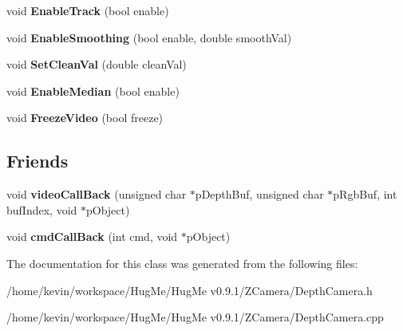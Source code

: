 \begin{DoxyCompactItemize}
\item 
\hypertarget{classCDepthCamera_ad0d6687953ff85c564a3c5dbc47611ca}{
void {\bfseries EnableTrack} (bool enable)}
\label{classCDepthCamera_ad0d6687953ff85c564a3c5dbc47611ca}

\item 
\hypertarget{classCDepthCamera_a69f4c73d7f3295ff6003fb66a50f9f9d}{
void {\bfseries EnableSmoothing} (bool enable, double smoothVal)}
\label{classCDepthCamera_a69f4c73d7f3295ff6003fb66a50f9f9d}

\item 
\hypertarget{classCDepthCamera_a06108a42c127014629a97acddfe20716}{
void {\bfseries SetCleanVal} (double cleanVal)}
\label{classCDepthCamera_a06108a42c127014629a97acddfe20716}

\item 
\hypertarget{classCDepthCamera_a62c9bc3fac5283b334e7bb6697601529}{
void {\bfseries EnableMedian} (bool enable)}
\label{classCDepthCamera_a62c9bc3fac5283b334e7bb6697601529}

\item 
\hypertarget{classCDepthCamera_aa6e04f2fe9f7954d961048ef817ca68f}{
void {\bfseries FreezeVideo} (bool freeze)}
\label{classCDepthCamera_aa6e04f2fe9f7954d961048ef817ca68f}

\end{DoxyCompactItemize}
\subsection*{Friends}
\begin{DoxyCompactItemize}
\item 
\hypertarget{classCDepthCamera_ac08b981ee61b617b6b0530e85880e692}{
void {\bfseries videoCallBack} (unsigned char $\ast$pDepthBuf, unsigned char $\ast$pRgbBuf, int bufIndex, void $\ast$pObject)}
\label{classCDepthCamera_ac08b981ee61b617b6b0530e85880e692}

\item 
\hypertarget{classCDepthCamera_ac9f4aa0d65f8d18cfc2ff367d68ae7db}{
void {\bfseries cmdCallBack} (int cmd, void $\ast$pObject)}
\label{classCDepthCamera_ac9f4aa0d65f8d18cfc2ff367d68ae7db}

\end{DoxyCompactItemize}


The documentation for this class was generated from the following files:\begin{DoxyCompactItemize}
\item 
/home/kevin/workspace/HugMe/HugMe v0.9.1/ZCamera/DepthCamera.h\item 
/home/kevin/workspace/HugMe/HugMe v0.9.1/ZCamera/DepthCamera.cpp\end{DoxyCompactItemize}
